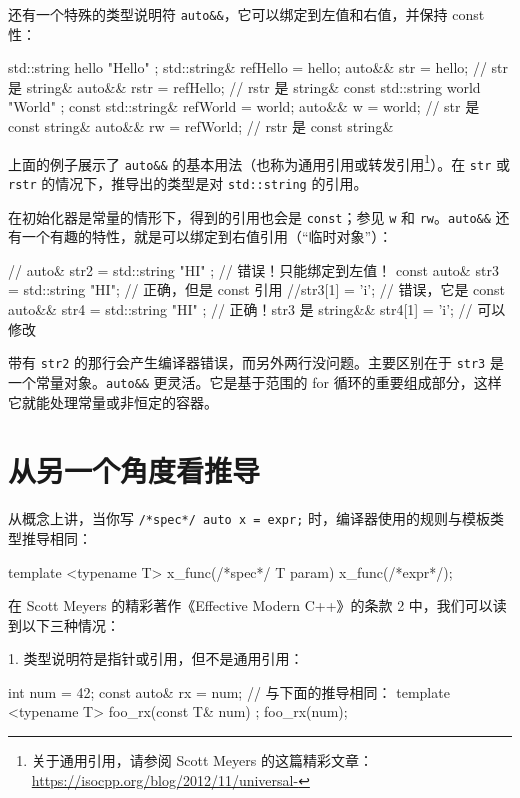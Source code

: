 还有一个特殊的类型说明符 \texttt{auto\&\&}，它可以绑定到左值和右值，并保持 const 性：

\begin{codebox}[cpp]
std::string hello { "Hello" };
std::string& refHello = hello;
auto&& str = hello;
// str 是 string&
auto&& rstr = refHello;
// rstr 是 string&
const std::string world { "World" };
const std::string& refWorld = world;
auto&& w = world;
// str 是 const string&
auto&& rw = refWorld;
// rstr 是 const string&
\end{codebox}

上面的例子展示了 \texttt{auto\&\&} 的基本用法（也称为通用引用或转发引用\footnote{关于通用引用，请参阅 Scott Meyers 的这篇精彩文章：\url{https://isocpp.org/blog/2012/11/universal-}}）。在 \texttt{str} 或 \texttt{rstr} 的情况下，推导出的类型是对 \texttt{std::string} 的引用。

在初始化器是常量的情形下，得到的引用也会是 \texttt{const}；参见 \texttt{w} 和 \texttt{rw}。\texttt{auto\&\&} 还有一个有趣的特性，就是可以绑定到右值引用（“临时对象”）：

\begin{codebox}[cpp]
// auto& str2 = std::string { "HI" }; // 错误！只能绑定到左值！
const auto& str3 = std::string { "HI"}; // 正确，但是 const 引用
//str3[1] = 'i';
// 错误，它是 const
auto&& str4 = std::string { "HI" }; // 正确！str3 是 string&&
str4[1] = 'i';
// 可以修改
\end{codebox}

带有 \texttt{str2} 的那行会产生编译器错误，而另外两行没问题。主要区别在于 \texttt{str3} 是一个常量对象。\texttt{auto\&\&} 更灵活。它是基于范围的 for 循环的重要组成部分，这样它就能处理常量或非恒定的容器。

\section{从另一个角度看推导}

从概念上讲，当你写 \texttt{/*spec*/ auto x = expr;} 时，编译器使用的规则与模板类型推导相同：

\begin{codebox}[cpp]
template <typename T> x_func(/*spec*/ T param) { }
x_func(/*expr*/);
\end{codebox}

在 Scott Meyers 的精彩著作《Effective Modern C++》的条款 2 中，我们可以读到以下三种情况：

1. 类型说明符是指针或引用，但不是通用引用：

\begin{codebox}[cpp]
int num = 42;
const auto& rx = num;
// 与下面的推导相同：
template <typename T> foo_rx(const T& num) { };
foo_rx(num);
\end{codebox}

